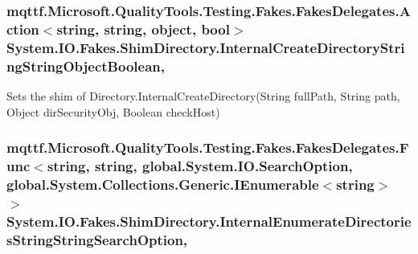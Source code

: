 \hypertarget{class_system_1_1_i_o_1_1_fakes_1_1_shim_directory_a71ae18f89903ec853b128ea1cc2999eb}{
\subsubsection[{Internal\-Create\-Directory\-String\-String\-Object\-Boolean}]{\setlength{\rightskip}{0pt plus 5cm}mqttf.\-Microsoft.\-Quality\-Tools.\-Testing.\-Fakes.\-Fakes\-Delegates.\-Action$<$string, string, object, bool$>$ System.\-I\-O.\-Fakes.\-Shim\-Directory.\-Internal\-Create\-Directory\-String\-String\-Object\-Boolean\hspace{0.3cm}{\ttfamily [static]}, {\ttfamily [set]}}}\label{class_system_1_1_i_o_1_1_fakes_1_1_shim_directory_a71ae18f89903ec853b128ea1cc2999eb}


Sets the shim of Directory.\-Internal\-Create\-Directory(\-String full\-Path, String path, Object dir\-Security\-Obj, Boolean check\-Host)

\hypertarget{class_system_1_1_i_o_1_1_fakes_1_1_shim_directory_a9d98402175d34acb2dd162133bca3d16}{
\subsubsection[{Internal\-Enumerate\-Directories\-String\-String\-Search\-Option}]{\setlength{\rightskip}{0pt plus 5cm}mqttf.\-Microsoft.\-Quality\-Tools.\-Testing.\-Fakes.\-Fakes\-Delegates.\-Func$<$string, string, global.\-System.\-I\-O.\-Search\-Option, global.\-System.\-Collections.\-Generic.\-I\-Enumerable$<$string$>$ $>$ System.\-I\-O.\-Fakes.\-Shim\-Directory.\-Internal\-Enumerate\-Directories\-String\-String\-Search\-Option\hspace{0.3cm}{\ttfamily [static]}, {\ttfamily [set]}}}\label{class_system_1_1_i_o_1_1_fakes_1_1_shim_directory_a9d98402175d34acb2dd162133bca3d16}


